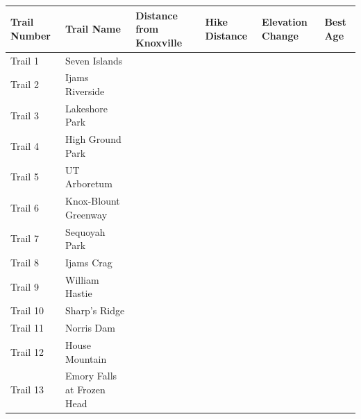 \documentclass[
  letterpaper,
  DIV=11,
  numbers=noendperiod]{scrreprt}
\begin{document}
\begin{longtable}[]{@{}
  >{\raggedright\arraybackslash}p{}
  >{\raggedright\arraybackslash}p{}
  >{\raggedright\arraybackslash}p{}
  >{\raggedright\arraybackslash}p{}
  >{\raggedright\arraybackslash}p{}
  >{\raggedright\arraybackslash}p{}@{}}
\toprule\noalign{}
\begin{minipage}[b]{\linewidth}\raggedright
\textbf{Trail Number}
\end{minipage} & \begin{minipage}[b]{\linewidth}\raggedright
\textbf{Trail Name}
\end{minipage} & \begin{minipage}[b]{\linewidth}\raggedright
Distance from Knoxville
\end{minipage} & \begin{minipage}[b]{\linewidth}\raggedright
Hike Distance
\end{minipage} & \begin{minipage}[b]{\linewidth}\raggedright
Elevation Change
\end{minipage} & \begin{minipage}[b]{\linewidth}\raggedright
Best Age
\end{minipage} \\
\midrule\noalign{}
\endhead
\bottomrule\noalign{}
\endlastfoot
Trail 1 & Seven Islands & & & & \\
Trail 2 & Ijams Riverside & & & & \\
Trail 3 & Lakeshore Park & & & & \\
Trail 4 & High Ground Park & & & & \\
Trail 5 & UT Arboretum & & & & \\
Trail 6 & Knox-Blount Greenway & & & & \\
Trail 7 & Sequoyah Park & & & & \\
Trail 8 & Ijams Crag & & & & \\
Trail 9 & William Hastie & & & & \\
Trail 10 & Sharp's Ridge & & & & \\
Trail 11 & Norris Dam & & & & \\
Trail 12 & House Mountain & & & & \\
Trail 13 & Emory Falls at Frozen Head & & & & \\

\end{longtable}
\end{document}
